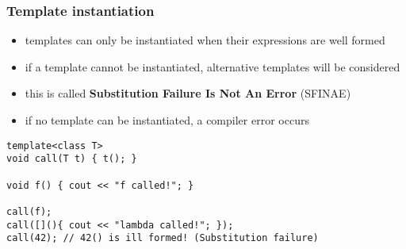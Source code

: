 \begin{frame}[fragile]
    \frametitle{Template instantiation}
    \begin{itemize}
        \item templates can only be instantiated when their expressions are well formed
        \item if a template cannot be instantiated, alternative templates will be considered
        \item this is called \textbf{Substitution Failure Is Not An Error} (SFINAE)
        \item if no template can be instantiated, a compiler error occurs
    \end{itemize}
    \begin{lstlisting}[numbers=none]
template<class T>
void call(T t) { t(); }

void f() { cout << "f called!"; }

call(f);
call([](){ cout << "lambda called!"; });
call(42); // 42() is ill formed! (Substitution failure)

    \end{lstlisting}
\end{frame}


